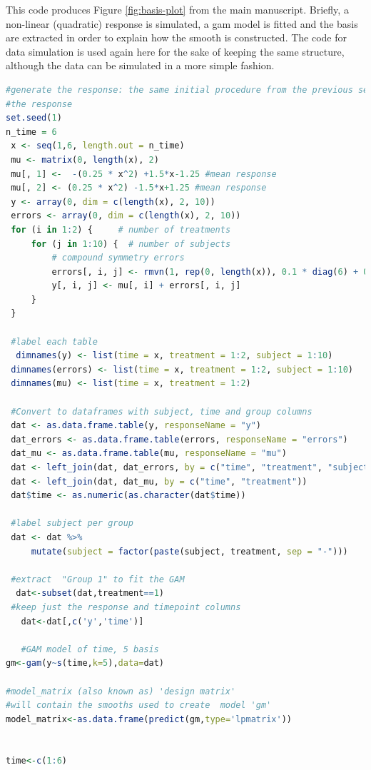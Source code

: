 \documentclass[
]{article}
\begin{document}
This code produces Figure \ref{fig:basis-plot} from the main manuscript. Briefly, a non-linear (quadratic) response is simulated, a gam model is fitted and the basis are extracted in order to explain how the smooth is constructed. The code for data simulation is used again here for the sake of keeping the same structure, although the data can be simulated in a more simple fashion.

\begin{lstlisting}[language=R]
#generate the response: the same initial procedure from the previous section to simulate
#the response
set.seed(1)
n_time = 6
 x <- seq(1,6, length.out = n_time)
 mu <- matrix(0, length(x), 2)
 mu[, 1] <-  -(0.25 * x^2) +1.5*x-1.25 #mean response
 mu[, 2] <- (0.25 * x^2) -1.5*x+1.25 #mean response
 y <- array(0, dim = c(length(x), 2, 10))
 errors <- array(0, dim = c(length(x), 2, 10))
 for (i in 1:2) {     # number of treatments
     for (j in 1:10) {  # number of subjects
         # compound symmetry errors
         errors[, i, j] <- rmvn(1, rep(0, length(x)), 0.1 * diag(6) + 0.25 * matrix(1, 6, 6))
         y[, i, j] <- mu[, i] + errors[, i, j]
     }
 }
 
 #label each table
  dimnames(y) <- list(time = x, treatment = 1:2, subject = 1:10)
 dimnames(errors) <- list(time = x, treatment = 1:2, subject = 1:10)
 dimnames(mu) <- list(time = x, treatment = 1:2)
 
 #Convert to dataframes with subject, time and group columns
 dat <- as.data.frame.table(y, responseName = "y")
 dat_errors <- as.data.frame.table(errors, responseName = "errors")
 dat_mu <- as.data.frame.table(mu, responseName = "mu")
 dat <- left_join(dat, dat_errors, by = c("time", "treatment", "subject"))
 dat <- left_join(dat, dat_mu, by = c("time", "treatment"))
 dat$time <- as.numeric(as.character(dat$time))
 
 #label subject per group
 dat <- dat %>%
     mutate(subject = factor(paste(subject, treatment, sep = "-")))
  
 #extract  "Group 1" to fit the GAM
  dat<-subset(dat,treatment==1)
 #keep just the response and timepoint columns
   dat<-dat[,c('y','time')]

   #GAM model of time, 5 basis
gm<-gam(y~s(time,k=5),data=dat)

#model_matrix (also known as) 'design matrix'
#will contain the smooths used to create  model 'gm'
model_matrix<-as.data.frame(predict(gm,type='lpmatrix'))


time<-c(1:6)


\end{lstlisting}
\end{document}
